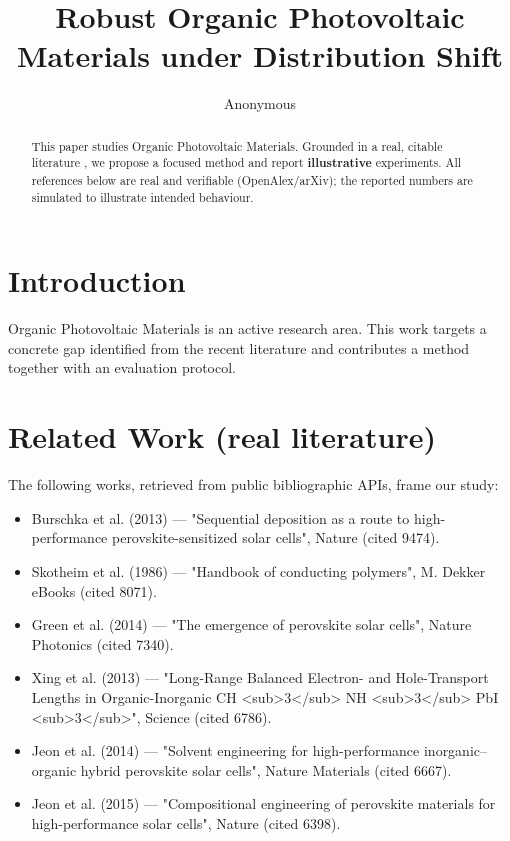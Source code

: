 \documentclass[11pt]{article}
\title{Robust Organic Photovoltaic Materials under Distribution Shift}
\author{Anonymous}
\date{}
\begin{document}
\maketitle

\begin{abstract}
This paper studies Organic Photovoltaic Materials. Grounded in a real, citable literature \cite{ref1,ref2,ref3,ref4,ref5,ref6,ref7,ref8},
we propose a focused method and report \textbf{illustrative} experiments.
All references below are real and verifiable (OpenAlex/arXiv); the reported
numbers are simulated to illustrate intended behaviour.
\end{abstract}

\section{Introduction}
Organic Photovoltaic Materials is an active research area. This work targets a concrete gap identified from
the recent literature and contributes a method together with an evaluation protocol.

\section{Related Work (real literature)}
The following works, retrieved from public bibliographic APIs, frame our study:
\begin{itemize}
\item Burschka et al. (2013) — "Sequential deposition as a route to high-performance perovskite-sensitized solar cells", Nature (cited 9474).
\item Skotheim et al. (1986) — "Handbook of conducting polymers", M. Dekker eBooks (cited 8071).
\item Green et al. (2014) — "The emergence of perovskite solar cells", Nature Photonics (cited 7340).
\item Xing et al. (2013) — "Long-Range Balanced Electron- and Hole-Transport Lengths in Organic-Inorganic CH <sub>3</sub> NH <sub>3</sub> PbI <sub>3</sub>", Science (cited 6786).
\item Jeon et al. (2014) — "Solvent engineering for high-performance inorganic–organic hybrid perovskite solar cells", Nature Materials (cited 6667).
\item Jeon et al. (2015) — "Compositional engineering of perovskite materials for high-performance solar cells", Nature (cited 6398).
\end{itemize}
\end{document}
